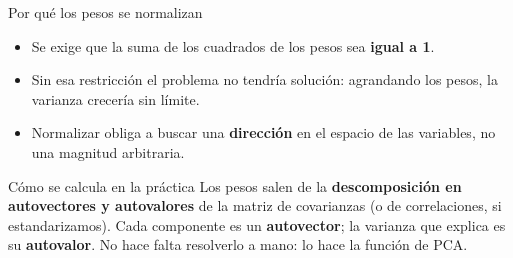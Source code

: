 \documentclass[aspectratio=169,xcolor=dvipsnames]{beamer}
\begin{document}

\begin{frame}{Por qu\'e los pesos se normalizan}
    \begin{itemize}
        \item Se exige que la suma de los cuadrados de los pesos sea \textbf{igual a 1}.
        \item Sin esa restricci\'on el problema \alert{no tendr\'ia soluci\'on}: agrandando los pesos, la varianza crecer\'ia sin l\'imite.
        \item Normalizar obliga a buscar una \textbf{direcci\'on} en el espacio de las variables, no una magnitud arbitraria.
    \end{itemize}
    \vfill
    \begin{block}{C\'omo se calcula en la pr\'actica}
        Los pesos salen de la \textbf{descomposici\'on en autovectores y autovalores} de la matriz de covarianzas (o de correlaciones, si estandarizamos). Cada componente es un \textbf{autovector}; la varianza que explica es su \textbf{autovalor}. No hace falta resolverlo a mano: lo hace la funci\'on de PCA.
    \end{block}
\end{frame}
\end{document}
